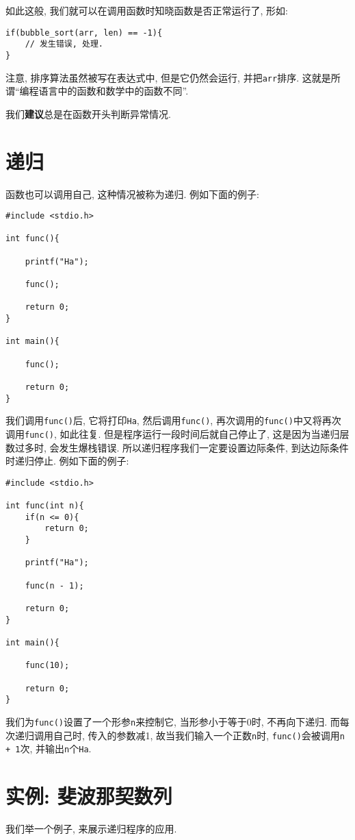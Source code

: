         如此这般, 我们就可以在调用函数时知晓函数是否正常运行了, 形如:
\begin{lstlisting}
if(bubble_sort(arr, len) == -1){
    // 发生错误, 处理.
}
\end{lstlisting}

        注意, 排序算法虽然被写在表达式中, 但是它仍然会运行, 并把\texttt{arr}排序. 这就是所谓``编程语言中的函数和数学中的函数不同''.

        我们\textbf{建议}总是在函数开头判断异常情况.

    \section{递归} 
        函数也可以调用自己, 这种情况被称为递归. 例如下面的例子:
\begin{lstlisting}
#include <stdio.h>

int func(){

    printf("Ha");

    func();

    return 0;
}

int main(){

    func();

    return 0;
}
\end{lstlisting}

        我们调用\texttt{func()}后, 它将打印\texttt{Ha}, 然后调用\texttt{func()}, 再次调用的\texttt{func()}中又将再次调用\texttt{func()}, 如此往复. 但是程序运行一段时间后就自己停止了, 这是因为当递归层数过多时, 会发生爆栈错误. 所以递归程序我们一定要设置边际条件, 到达边际条件时递归停止. 例如下面的例子:
\begin{lstlisting}
#include <stdio.h>

int func(int n){
    if(n <= 0){
        return 0;
    }

    printf("Ha");

    func(n - 1);

    return 0;
}

int main(){

    func(10);

    return 0;
}
\end{lstlisting}

        我们为\texttt{func()}设置了一个形参\texttt{n}来控制它, 当形参小于等于0时, 不再向下递归. 而每次递归调用自己时, 传入的参数减1, 故当我们输入一个正数\texttt{n}时, \texttt{func()}会被调用\texttt{n + 1}次, 并输出\texttt{n}个\texttt{Ha}.

    \section{实例: 斐波那契数列}
        我们举一个例子, 来展示递归程序的应用.

